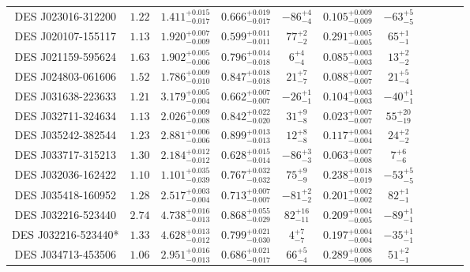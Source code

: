 \documentclass[tradiabstract,twocolumn]{aa}
\begin{document}
{\begin{longtable}{c c c c c c c c c c c}
DES J023016-312200 &           $1.22$ & $1.411^{+0.015}_{-0.017}$ & $0.666^{+0.019}_{-0.017}$ &   $-86^{+4}_{-4}$ & $0.105^{+0.009}_{-0.009}$ &   $-63^{+5}_{-5}$ \\
DES J020107-155117 &           $1.13$ & $1.920^{+0.007}_{-0.009}$ & $0.599^{+0.011}_{-0.011}$ &    $77^{+2}_{-2}$ & $0.291^{+0.005}_{-0.005}$ &    $65^{+1}_{-1}$ \\
DES J021159-595624 &           $1.63$ & $1.902^{+0.005}_{-0.006}$ & $0.796^{+0.014}_{-0.018}$ &     $6^{+4}_{-4}$ & $0.085^{+0.003}_{-0.003}$ &    $13^{+2}_{-2}$ \\
DES J024803-061606 &           $1.52$ & $1.786^{+0.009}_{-0.010}$ & $0.847^{+0.018}_{-0.018}$ &    $21^{+7}_{-7}$ & $0.088^{+0.007}_{-0.007}$ &    $21^{+5}_{-4}$ \\
DES J031638-223633 &           $1.21$ & $3.179^{+0.005}_{-0.004}$ & $0.662^{+0.007}_{-0.007}$ &   $-26^{+1}_{-1}$ & $0.104^{+0.003}_{-0.003}$ &   $-40^{+1}_{-1}$ \\
DES J032711-324634 &           $1.13$ & $2.026^{+0.009}_{-0.008}$ & $0.842^{+0.022}_{-0.020}$ &    $31^{+9}_{-8}$ & $0.023^{+0.007}_{-0.007}$ &  $55^{+20}_{-19}$ \\
DES J035242-382544 &           $1.23$ & $2.881^{+0.006}_{-0.006}$ & $0.899^{+0.013}_{-0.013}$ &    $12^{+8}_{-8}$ & $0.117^{+0.004}_{-0.004}$ &    $24^{+2}_{-2}$ \\
DES J033717-315213 &           $1.30$ & $2.184^{+0.012}_{-0.012}$ & $0.628^{+0.015}_{-0.014}$ &   $-86^{+3}_{-3}$ & $0.063^{+0.007}_{-0.008}$ &     $7^{+6}_{-6}$ \\
DES J032036-162422 &           $1.10$ & $1.101^{+0.035}_{-0.039}$ & $0.767^{+0.032}_{-0.032}$ &    $75^{+9}_{-9}$ & $0.238^{+0.018}_{-0.019}$ &   $-53^{+5}_{-5}$ \\
DES J035418-160952 &           $1.28$ & $2.517^{+0.003}_{-0.004}$ & $0.713^{+0.007}_{-0.007}$ &   $-81^{+2}_{-2}$ & $0.201^{+0.002}_{-0.002}$ &    $82^{+1}_{-1}$ \\
DES J032216-523440 &           $2.74$ & $4.738^{+0.016}_{-0.013}$ & $0.868^{+0.055}_{-0.029}$ &  $82^{+16}_{-11}$ & $0.209^{+0.004}_{-0.005}$ &   $-89^{+1}_{-1}$ \\
DES J032216-523440* &          $1.33$ & $4.628^{+0.013}_{-0.012}$ & $0.799^{+0.021}_{-0.030}$ &     $4^{+7}_{-7}$ & $0.197^{+0.004}_{-0.004}$ &   $-35^{+1}_{-1}$ \\
DES J034713-453506 &           $1.06$ & $2.951^{+0.016}_{-0.013}$ & $0.686^{+0.021}_{-0.017}$ &    $66^{+5}_{-4}$ & $0.289^{+0.008}_{-0.006}$ &    $51^{+2}_{-1}$ \\

\end{longtable}}
\end{document}
